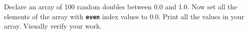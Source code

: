 Declare an array of 100 random doubles between 0.0 and 1.0. Now set all the elements of the array with \texttt{\textbf{even}} index values to 0.0. Print all the values in your array. Visually verify your work.

